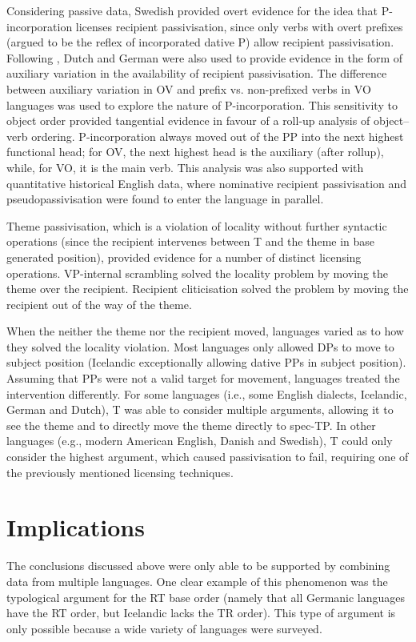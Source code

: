 Considering passive data, Swedish provided overt evidence for the idea that P-incorporation licenses recipient passivisation, since only verbs with overt prefixes (argued to be the reflex of incorporated dative P) allow recipient passivisation. Following \cite{Alexiadou.2014}, Dutch and German were also used to provide evidence in the form of auxiliary variation in the availability of recipient passivisation. The difference between auxiliary variation in OV and prefix vs. non-prefixed verbs in VO languages was used to explore the nature of P-incorporation. This sensitivity to object order provided tangential evidence in favour of a roll-up analysis of object--verb ordering. P-incorporation always moved out of the PP into the next highest functional head; for OV, the next highest head is the auxiliary (after rollup), while, for VO, it is the main verb. This analysis was also supported with quantitative historical English data, where nominative recipient passivisation and pseudopassivisation were found to enter the language in parallel.

Theme passivisation, which is a violation of locality without further syntactic operations (since the recipient intervenes between T and the theme in base generated position), provided evidence for a number of distinct licensing operations. VP-internal scrambling solved the locality problem by moving the theme over the recipient. Recipient cliticisation solved the problem by moving the recipient out of the way of the theme.

When the neither the theme nor the recipient moved, languages varied as to how they solved the locality violation. Most languages only allowed DPs to move to subject position (Icelandic exceptionally allowing dative PPs in subject position). Assuming that PPs were not a valid target for movement, languages treated the intervention differently. For some languages (i.e., some English dialects, Icelandic, German and Dutch), T was able to consider multiple arguments, allowing it to see the theme and to directly move the theme directly to spec-TP. In other languages (e.g., modern American English, Danish and Swedish), T could only consider the highest argument, which caused passivisation to fail, requiring one of the previously mentioned licensing techniques.

\section{Implications}
The conclusions discussed above were only able to be supported by combining data from multiple languages. One clear example of this phenomenon was the typological argument for the RT base order (namely that all Germanic languages have the RT order, but Icelandic lacks the TR order). This type of argument is only possible because a wide variety of languages were surveyed.

